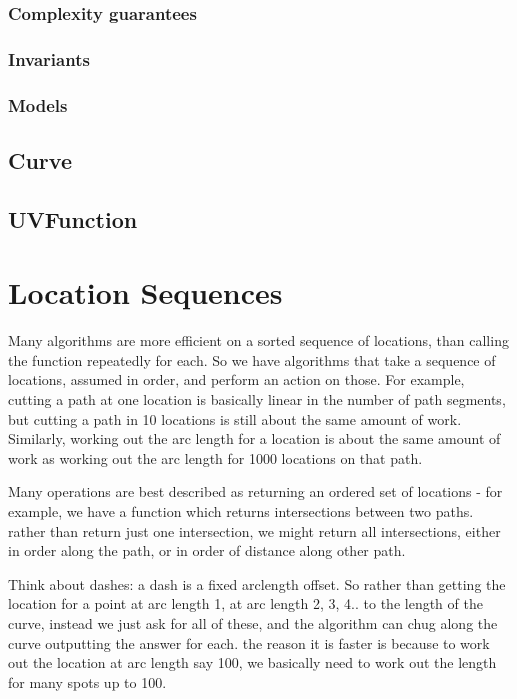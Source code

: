 \documentclass[openany]{book}
\begin{document}
\subsubsection{Complexity guarantees}

\subsubsection{Invariants}

\subsubsection{Models}

\subsection{Curve}

\subsection{UVFunction}

\section{Location Sequences}

Many algorithms are more efficient on a sorted sequence of locations,
than calling the function repeatedly for each.  So we have algorithms
that take a sequence of locations, assumed in order, and perform an
action on those.  For example, cutting a path at one location is
basically linear in the number of path segments, but cutting a path in
10 locations is still about the same amount of work.  Similarly,
working out the arc length for a location is about the same amount of
work as working out the arc length for 1000 locations on that path.

Many operations are best described as returning an ordered set of
locations - for example, we have a function which returns
intersections between two paths.  rather than return just one
intersection, we might return all intersections, either in order along
the path, or in order of distance along other path.

Think about dashes: a dash is a fixed arclength offset.  So rather
than getting the location for a point at arc length 1, at arc length
2, 3, 4.. to the length of the curve, instead we just ask for all of
these, and the algorithm can chug along the curve outputting the
answer for each.  the reason it is faster is because to work out the
location at arc length say 100, we basically need to work out the
length for many spots up to 100.
\end{document}
